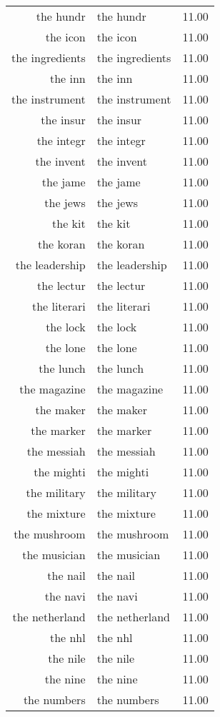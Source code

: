 \begin{table}[ht]
\begin{tabular}{rlr}
  the hundr & the hundr & 11.00 \\ 
  the icon & the icon & 11.00 \\ 
  the ingredients & the ingredients & 11.00 \\ 
  the inn & the inn & 11.00 \\ 
  the instrument & the instrument & 11.00 \\ 
  the insur & the insur & 11.00 \\ 
  the integr & the integr & 11.00 \\ 
  the invent & the invent & 11.00 \\ 
  the jame & the jame & 11.00 \\ 
  the jews & the jews & 11.00 \\ 
  the kit & the kit & 11.00 \\ 
  the koran & the koran & 11.00 \\ 
  the leadership & the leadership & 11.00 \\ 
  the lectur & the lectur & 11.00 \\ 
  the literari & the literari & 11.00 \\ 
  the lock & the lock & 11.00 \\ 
  the lone & the lone & 11.00 \\ 
  the lunch & the lunch & 11.00 \\ 
  the magazine & the magazine & 11.00 \\ 
  the maker & the maker & 11.00 \\ 
  the marker & the marker & 11.00 \\ 
  the messiah & the messiah & 11.00 \\ 
  the mighti & the mighti & 11.00 \\ 
  the military & the military & 11.00 \\ 
  the mixture & the mixture & 11.00 \\ 
  the mushroom & the mushroom & 11.00 \\ 
  the musician & the musician & 11.00 \\ 
  the nail & the nail & 11.00 \\ 
  the navi & the navi & 11.00 \\ 
  the netherland & the netherland & 11.00 \\ 
  the nhl & the nhl & 11.00 \\ 
  the nile & the nile & 11.00 \\ 
  the nine & the nine & 11.00 \\ 
  the numbers & the numbers & 11.00 \\ 

\end{tabular}
\end{table}
